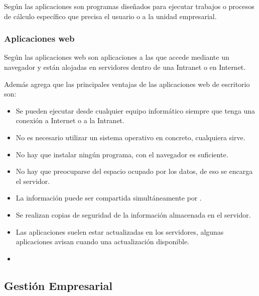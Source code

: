 Seg\'un \cite{pablos} las aplicaciones son programas dise\~nados para ejecutar
trabajos o procesos de c\'alculo espec\'ifico que precisa el usuario o a la unidad
empresarial.
\subsubsection{Aplicaciones web}
Seg\'un \cite{nino} las aplicaciones web son aplicaciones a las que accede mediante un
navegador y est\'an alojadas en servidores dentro de una Intranet o en Internet.

Adem\'as \cite{nino} agrega que las principales ventajas de las aplicaciones web de
escritorio son:
\begin{itemize}
    \item Se pueden ejecutar desde cualquier equipo inform\'atico siempre que tenga
          una conexi\'on a Internet o a la Intranet.
    \item No es necesario utilizar un sistema operativo en concreto, cualquiera sirve.
    \item No hay que instalar ning\'un programa, con el navegador es suficiente.
    \item No hay que preocuparse del espacio ocupado por los datos, de eso se encarga
          el servidor.
    \item La informaci\'on puede ser compartida simult\'aneamente por .
    \item Se realizan copias de seguridad de la informaci\'on almacenada en el servidor.
    \item Las aplicaciones suelen estar actualizadas en los servidores, algunas
          aplicaciones avisan cuando una actualizaci\'on disponible.
    \item
\end{itemize}

\subsection{Gesti\'on Empresarial}
